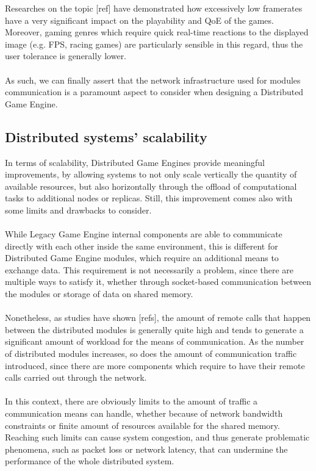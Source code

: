Researches on the topic [ref] have demonstrated how excessively low framerates have a very significant impact on the playability and QoE of the games. Moreover, gaming genres which require quick real-time reactions to the displayed image (e.g. FPS, racing games) are particularly sensible in this regard, thus the user tolerance is generally lower. \\ \\
As such, we can finally assert that the network infrastructure used for modules communication is a paramount aspect to consider when designing a Distributed Game Engine.

\subsection{Distributed systems' scalability}
In terms of scalability, Distributed Game Engines provide meaningful improvements, by allowing systems to not only scale vertically the quantity of available resources, but also horizontally through the offload of computational tasks to additional nodes or replicas. Still, this improvement comes also with some limits and drawbacks to consider. \\ \\
While Legacy Game Engine internal components are able to communicate directly with each other inside the same environment, this is different for Distributed Game Engine modules, which require an additional means to exchange data. This requirement is not necessarily a problem, since there are multiple ways to satisfy it, whether through socket-based communication between the modules or storage of data on shared memory. \\ \\ Nonetheless, as studies have shown [refs], the amount of remote calls that happen between the distributed modules is generally quite high and tends to generate a significant amount of workload for the means of communication. As the number of distributed modules increases, so does the amount of communication traffic introduced, since there are more components which require to have their remote calls carried out through the network. \\ \\
In this context, there are obviously limits to the amount of traffic a communication means can handle, whether because of network bandwidth constraints or finite amount of resources available for the shared memory. Reaching such limits can cause system congestion, and thus generate problematic phenomena, such as packet loss or network latency, that can undermine the performance of the whole distributed system. \\ \\
